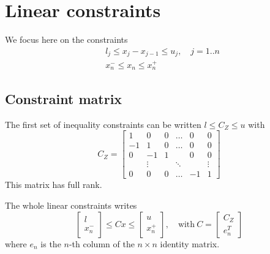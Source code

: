 \documentclass[]{article}
\newcommand{\BIN}{\begin{bmatrix}}
\newcommand{\BOUT}{\end{bmatrix}}
\begin{document}
\section{Linear constraints}
We focus here on the constraints
\begin{align*}
 & l_j \leq x_j - x_{j-1} \leq u_j, \quad j=1..n \label{eq:inequality}\\
 & x_n^- \leq x_n \leq x_n^+
\end{align*}

\subsection{Constraint matrix}
The first set of inequality constraints can be written $l \leq C_Z \leq u$ with
\begin{equation}
  C_Z = \BIN  1 &  0 & 0 & \ldots &  0 & 0\\
             -1 &  1 & 0 & \ldots &  0 & 0\\
              0 & -1 & 1 &        &  0 & 0\\
                & \vdots &&\ddots &    & \vdots \\
              0 &  0 & 0 & \ldots & -1 & 1\BOUT 
\end{equation}
This matrix has full rank.

The whole linear constraints writes
\begin{equation}
  \BIN l \\ x_n^- \BOUT \leq C x \leq \BIN u \\ x_n^+ \BOUT, \quad \mbox{with}\ C = \BIN C_Z \\ e_n^T\BOUT
  \label{eq:feasibility}
\end{equation}
where $e_n$ is the $n$-th column of the $n\times n$ identity matrix.
\end{document}
